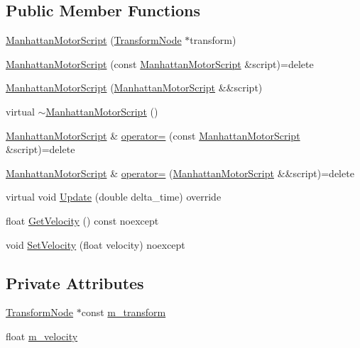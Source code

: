 \subsection*{Public Member Functions}
\begin{DoxyCompactItemize}
\item 
\hyperlink{classmage_1_1_manhattan_motor_script_a6a40360d3b1603e8e5fc64a230ed7574}{Manhattan\+Motor\+Script} (\hyperlink{structmage_1_1_transform_node}{Transform\+Node} $\ast$transform)
\item 
\hyperlink{classmage_1_1_manhattan_motor_script_a890f4456d4707e6eb33e43837b26e536}{Manhattan\+Motor\+Script} (const \hyperlink{classmage_1_1_manhattan_motor_script}{Manhattan\+Motor\+Script} \&script)=delete
\item 
\hyperlink{classmage_1_1_manhattan_motor_script_ae573b594372f184a524c6c9f35517fae}{Manhattan\+Motor\+Script} (\hyperlink{classmage_1_1_manhattan_motor_script}{Manhattan\+Motor\+Script} \&\&script)
\item 
virtual \hyperlink{classmage_1_1_manhattan_motor_script_a86d4f8c4ba0aa94358ea2bc77f9a2a69}{$\sim$\+Manhattan\+Motor\+Script} ()
\item 
\hyperlink{classmage_1_1_manhattan_motor_script}{Manhattan\+Motor\+Script} \& \hyperlink{classmage_1_1_manhattan_motor_script_a563d4d429bbcabf25f57539857dde53c}{operator=} (const \hyperlink{classmage_1_1_manhattan_motor_script}{Manhattan\+Motor\+Script} \&script)=delete
\item 
\hyperlink{classmage_1_1_manhattan_motor_script}{Manhattan\+Motor\+Script} \& \hyperlink{classmage_1_1_manhattan_motor_script_a944149dc06764bc23feffde4de100679}{operator=} (\hyperlink{classmage_1_1_manhattan_motor_script}{Manhattan\+Motor\+Script} \&\&script)=delete
\item 
virtual void \hyperlink{classmage_1_1_manhattan_motor_script_aa2aee651ef777e71ac8da8345f86b212}{Update} (double delta\+\_\+time) override
\item 
float \hyperlink{classmage_1_1_manhattan_motor_script_a4df8eb1593f7fd3e131de44caa3ac1e1}{Get\+Velocity} () const noexcept
\item 
void \hyperlink{classmage_1_1_manhattan_motor_script_a01f227fa82d78b0be767948c2103d727}{Set\+Velocity} (float velocity) noexcept
\end{DoxyCompactItemize}
\subsection*{Private Attributes}
\begin{DoxyCompactItemize}
\item 
\hyperlink{structmage_1_1_transform_node}{Transform\+Node} $\ast$const \hyperlink{classmage_1_1_manhattan_motor_script_a87af31ce6376830ed040b19d78da386e}{m\+\_\+transform}
\item 
float \hyperlink{classmage_1_1_manhattan_motor_script_a824893c374fa6f271a964751dc1a59ec}{m\+\_\+velocity}
\end{DoxyCompactItemize}
